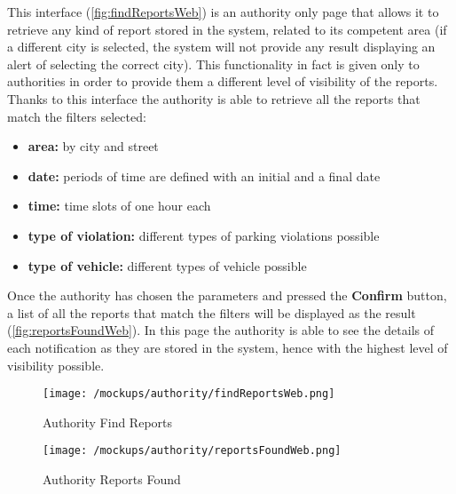 				This interface (\autoref{fig:findReportsWeb}) is an authority only page that allows it to retrieve any kind of report stored in the system, related to its competent area (if a different city is selected, the system will not provide any result displaying an alert of selecting the correct city). This functionality in fact is given only to authorities in order to provide them a different level of visibility of the reports.\\
				
				Thanks to this interface the authority is able to retrieve all the reports that match the filters selected:
				
				\begin{itemize}
					\item \textbf{area:} by city and street
					\item \textbf{date:} periods of time are defined with an initial and a final date
					\item \textbf{time:} time slots of one hour each
					\item \textbf{type of violation:} different types of parking violations possible
					\item \textbf{type of vehicle:} different types of vehicle possible
				\end{itemize} 
			
				Once the authority has chosen the parameters and pressed the \textbf{Confirm} button, a list of all the reports that match the filters will be displayed as the result (\autoref{fig:reportsFoundWeb}). In this page the authority is able to see the details of each notification as they are stored in the system, hence with the highest level of visibility possible.\\
				
				\newpage
				
				\begin{figure}[ht!]
					\centering
					\texttt{[image: /mockups/authority/findReportsWeb.png]}
					\caption{\label{fig:findReportsWeb} Authority Find Reports}
				\end{figure}
			
				\vspace{1cm}
			
				\begin{figure}[ht!]
					\centering
					\texttt{[image: /mockups/authority/reportsFoundWeb.png]}
					\caption{\label{fig:reportsFoundWeb} Authority Reports Found}
				\end{figure}
			
